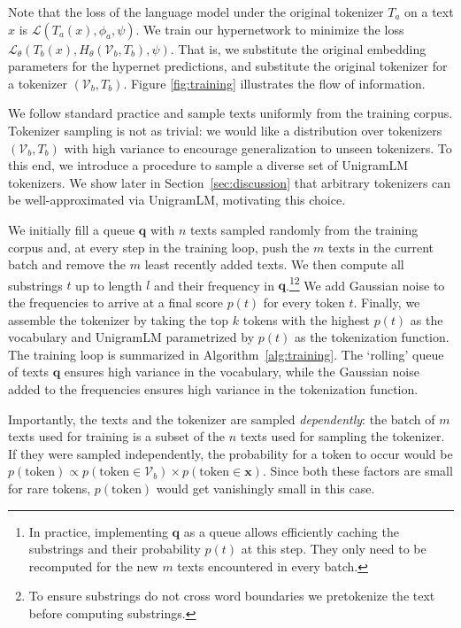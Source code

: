 \documentclass{article}
\begin{document}
Note that the loss of the language model under the original tokenizer \(T_a\) on a text \(x\) is \(\mathcal{L}(T_{a}(x), \phi_a,\psi)\). We train our hypernetwork to minimize the loss \(
\mathcal{L}_{\theta}(
T_b(x),
H_{\theta}(\mathcal{V}_b, T_b),
\psi
)
\). That is, we substitute the original embedding parameters for the hypernet predictions, and substitute the original tokenizer for a tokenizer $(\mathcal{V}_b, T_b)$. Figure \ref{fig:training} illustrates the flow of information.

 We follow standard practice and sample texts uniformly from the training corpus.
Tokenizer sampling is not as trivial: we would like a distribution over tokenizers $(\mathcal{V}_b, T_b)$ with high variance to encourage generalization to unseen tokenizers. To this end, we introduce a procedure to sample a diverse set of UnigramLM tokenizers. We show later in Section~\ref{sec:discussion} that arbitrary tokenizers can be well-approximated via UnigramLM, motivating this choice.

We initially fill a queue $\bm{q}$ with $n$ texts sampled randomly from the training corpus and, at every step in the training loop, push the $m$ texts in the current batch and remove the $m$ least recently added texts. We then compute all substrings $t$ up to length $l$ and their frequency in $\bm{q}$.\footnote{In practice, implementing $\bm{q}$ as a queue allows efficiently caching the substrings and their probability $p(t)$ at this step. They only need to be recomputed for the new $m$ texts encountered in every batch.}\footnote{To ensure substrings do not cross word boundaries we pretokenize the text before computing substrings.} We add Gaussian noise to the frequencies to arrive at a final score $p(t)$ for every token $t$. Finally, we assemble the tokenizer by taking the top $k$ tokens with the highest $p(t)$ as the vocabulary and UnigramLM parametrized by $p(t)$ as the tokenization function. The training loop is summarized in Algorithm~\ref{alg:training}. The `rolling' queue of texts $\bm{q}$ ensures high variance in the vocabulary, while the Gaussian noise added to the frequencies ensures high variance in the tokenization function.

Importantly, the texts and the tokenizer are sampled \textit{dependently}: the batch of $m$ texts used for training is a subset of the $n$ texts used for sampling the tokenizer. If they were sampled independently, the probability for a token to occur would be $p(\text{token}) \propto p(\text{token} \in \mathcal{V}_b) \times p(\text{token} \in \bm{x})$. Since both these factors are small for rare tokens, $p(\text{token})$ would get vanishingly small in this case. %
 
\end{document}
